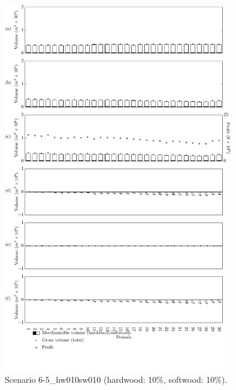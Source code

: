 \begin{figure}[h]
  \centering
  \includegraphics[width=10cm]{images/appendix/s6-5_hw010sw010}
  \caption{Scenario 6-5\_hw010sw010 (hardwood: 10\%, softwood: 10\%).}
  \label{fig:s6-5_hw010sw010}
\end{figure}

